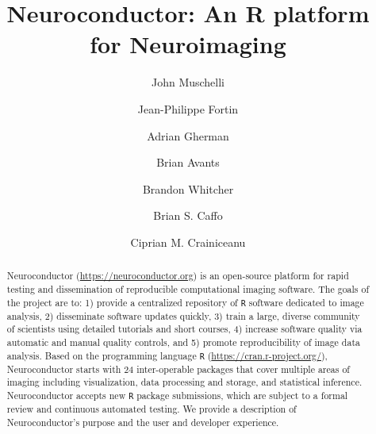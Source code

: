 \documentclass[]{elsarticle} %
\newcommand{\rlang}{\texttt{R}}
\begin{document}
\begin{frontmatter}

  \title{Neuroconductor: An R platform for Neuroimaging}
    \author[JHU]{John Muschelli}
    \author[Penn]{Jean-Philippe Fortin}
  
    \author[JHU]{Adrian Gherman}
   \author[Biogen]{Brian Avants}
   
   \author[Klarismo,Imperial]{Brandon Whitcher}
   
    \author[JHU]{Brian S. Caffo}
  
    \author[JHU]{Ciprian M. Crainiceanu}
  
      \address[JHU]{Johns Hopkins Bloomberg School of Public Health, Department of
Biostatistics, 615 N Wolfe St, Baltimore, MD, 21205}
    \address[Penn]{Perelman School of Medicine, University of Pennsylvania, Department of
Biostatistics and Epidemiology, 423 Guardian Drive, Philadelphia, PA
19104}
      \address[Biogen]{Biogen, Cambridge, MA 02142}
      \address[Klarismo]{Klarismo Ltd, London, UK}
      \address[Imperial]{Department of Mathematics, Imperial College London, London, UK}
  
  \begin{abstract}
Neuroconductor (\url{https://neuroconductor.org}) is an open-source platform for rapid testing and dissemination of reproducible computational imaging software. The goals of the project are to: 1) provide a centralized repository of {\rlang} software dedicated to image analysis, 2) disseminate  software updates quickly, 3) train a large, diverse community of scientists using detailed tutorials and short courses, 4) increase software quality via automatic and manual quality controls, and 5) promote reproducibility of image data analysis. Based on the  programming language {\rlang} (\url{https://cran.r-project.org/}), Neuroconductor starts with 24 inter-operable packages that cover multiple areas of imaging including visualization, data processing and storage, and statistical inference. Neuroconductor accepts new {\rlang} package submissions, which are subject to a formal review and continuous automated testing. We provide a description of Neuroconductor's purpose and the user and developer experience.  
\end{abstract}
 
 \end{frontmatter}
\end{document}
